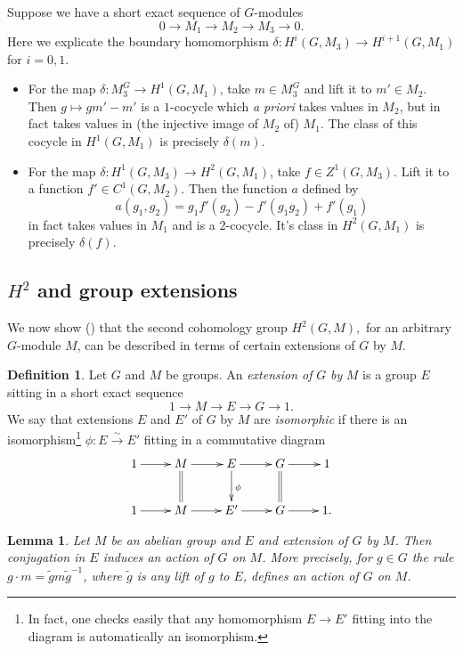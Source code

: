 \documentclass[11pt]{amsart}
\numberwithin{equation}{section}
\newtheorem{lemma}[equation]{Lemma}
\theoremstyle{remark}
\theoremstyle{remark}
\theoremstyle{remark}
\theoremstyle{definition}
\theoremstyle{definition}
\theoremstyle{definition}
\newtheorem{defi}[equation]{Definition}
\theoremstyle{definition}
\theoremstyle{definition}
\theoremstyle{definition}
\begin{document}
Suppose we have a short exact sequence of $G$-modules
\[0\rightarrow M_1 \rightarrow M_2 \rightarrow M_3 \rightarrow 0.\]
Here we explicate the boundary homomorphism $\delta:H^i(G,M_3)\rightarrow H^{i+1}(G,M_1)$ for $i=0,1$.

\begin{itemize}
\item 
For the map $\delta:M_3^G\rightarrow H^1(G,M_1)$,  take $m\in M_3^{G}$ and lift it to $m'\in M_2$. Then $g \mapsto gm'-m'$ is a $1$-cocycle which \textit{a priori} takes values in $M_2$, but in fact takes values in (the injective image of $M_2$ of) $M_1$. The class of this cocycle in $H^1(G,M_1)$ is precisely $\delta(m)$.  
\\
\item 
For the map $\delta:H^1(G,M_3)\rightarrow H^2(G,M_1)$, take $f\in Z^1(G,M_3)$. Lift it to a function $f'\in C^1(G,M_2)$. Then the function $a$ defined by
\[a(g_1,g_2)=g_1f'(g_2)-f'(g_1g_2)+f'(g_1)\]
in fact takes values in $M_1$ and is a $2$-cocycle. It's class in $H^2(G,M_1)$ is precisely $\delta(f)$. 
\end{itemize}

\subsection{$H^2$ and group extensions}

We now show () that the second cohomology group $H^2(G,M),$ for an arbitrary $G$-module $M$, can be described in terms of certain extensions of $G$ by $M$.

\begin{defi}
Let $G$ and $M$ be groups.
An \textit{extension of }$G$ \textit{by} $M$ is a group $E$ sitting in a short exact sequence
\[1\longrightarrow M\longrightarrow E \longrightarrow G \longrightarrow 1.\]
We say that extensions $E$ and $E'$ of $G$ by $M$ are \textit{isomorphic} if there is an isomorphism\footnote{In fact, one checks easily that any homomorphism  $E\rightarrow E'$ fitting into the diagram is automatically an isomorphism.} $\phi:E\stackrel{\sim}{\longrightarrow} E'$  fitting in a commutative diagram 
\[\xymatrix{1\ar[r] & M\ar[r]\ar@{=}[d] & E\ar[d]^\phi\ar[r] & G\ar@{=}[d]\ar[r] & 1\\ 1\ar[r] & M\ar[r] & E'\ar[r] & G\ar[r] & 1.}\]
\end{defi}

\begin{lemma}
Let $M$ be an abelian group and $E$ and extension of $G$ by $M$. Then conjugation in $E$ induces an action of $G$ on $M$. More precisely, for $g\in G$ the rule $g\cdot m=\tilde{g}m\tilde{g}^{-1}$, where $\tilde{g}$ is any lift of $g$ to $E$, defines an action of $G$ on $M$.
\end{lemma}
\end{document}
